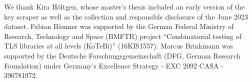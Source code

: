 We thank Kira Höltgen, whose master's thesis included an early version of the key scraper as well as the collection and responsible disclosure of the June 2023 dataset. Fabian Bäumer was supported by the German Federal Ministry of Research, Technology and Space (BMFTR) project ``Combinatorial testing of TLS libraries at all levels (KoTeBi)'' (16KIS1557). Marcus Brinkmann was supported by the Deutsche Forschungsgemeinschaft (DFG, German Research Foundation) under Germany's Excellence Strategy - EXC 2092 CASA - 390781972.
